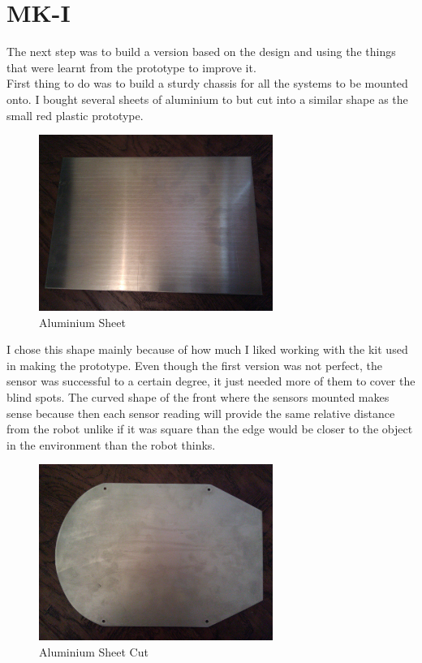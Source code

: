 \section{MK-I}
The next step was to build a version based on the design and using the things that were learnt from the prototype to improve it.
\\First thing to do was to build a sturdy chassis for all the systems to be mounted onto.  I bought several sheets of aluminium to but cut into a similar shape as the small red plastic prototype.
\begin{figure}[H]
\centering
        \includegraphics[width=3.0in]  {Images/alu-sheet-2.jpg}
        \caption{Aluminium Sheet}
        \label{Aluminium Sheet}
\end{figure}
I chose this shape mainly because of how much I liked working with the kit used in making the prototype.  Even though the first version was not perfect, the sensor was successful to a certain degree, it just needed more of them to cover the blind spots.  The curved shape of the front where the sensors mounted makes sense because then each sensor reading will provide the same relative distance from the robot unlike if it was square than the edge would be closer to the object in the environment than the robot thinks.
\begin{figure}[H]
\centering
        \includegraphics[width=3.0in]  {Images/alu-cut-2.jpg}
        \caption{Aluminium Sheet Cut}
        \label{Aluminium Sheet Cut}
\end{figure}
